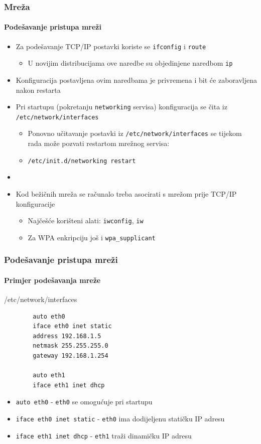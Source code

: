 \documentclass[table,usenames,dvipsnames]{beamer}
\newcommand{\shell}[1]{\texttt{#1}}
\begin{document}
\begin{frame}[t]
	\frametitle{Mreža}
	\framesubtitle{Podešavanje pristupa mreži}
	\begin{itemize}
		\item Za podešavanje TCP/IP postavki koriste se \shell{ifconfig} i \shell{route}
		\begin{itemize}
			\item U novijim distribucijama ove naredbe su objedinjene naredbom \shell{ip}
		\end{itemize}
		\item Konfiguracija postavljena ovim naredbama je privremena i bit će zaboravljena nakon restarta
		\item Pri startupu (pokretanju \shell{networking} servisa) konfiguracija se čita iz \shell{/etc/network/interfaces}
		\begin{itemize}
			\item Ponovno učitavanje postavki iz \shell{/etc/network/interfaces} se tijekom rada može pozvati restartom mrežnog servisa:
			\item[] \shell{/etc/init.d/networking restart}
		\end{itemize}
		\item[]
		\item Kod bežičnih mreža se računalo treba asocirati s mrežom prije TCP/IP konfiguracije
		\begin{itemize}
			\item Najčešće korišteni alati: \shell{iwconfig}, \shell{iw}
			\item Za WPA enkripciju još i \shell{wpa\_supplicant}
		\end{itemize}
	\end{itemize}
\end{frame}

\begin{frame}[fragile]
	\frametitle{Podešavanje pristupa mreži}
	\framesubtitle{Primjer podešavanja mreže}
	\begin{block}{/etc/network/interfaces}
		\ttfamily
		\begin{verbatim}
		auto eth0
		iface eth0 inet static
		address 192.168.1.5
		netmask 255.255.255.0
		gateway 192.168.1.254
		
		auto eth1
		iface eth1 inet dhcp
		\end{verbatim}
	\end{block}
	\begin{itemize}
		\item \shell{auto eth0} - \shell{eth0} se omogućuje pri startupu
		\item \shell{iface eth0 inet static} - \shell{eth0} ima dodijeljenu statičku IP adresu
		\item \shell{iface eth1 inet dhcp} - \shell{eth1} traži dinamičku IP adresu
	\end{itemize}
\end{frame}
\end{document}
